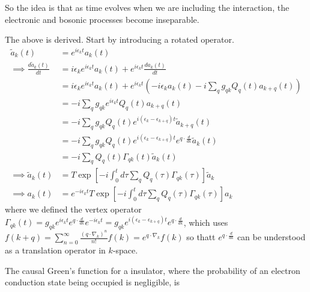 So the idea is that as time evolves when we are including the interaction, the electronic and bosonic processes become inseparable.
\begin{tcolorbox}
The above is derived. Start by introducing a rotated operator.
\begin{align}
    \tilde{a}_k(t)&=e^{i \epsilon_k t} a_k(t) \\
\implies \frac{d \tilde{a}_k(t)}{d t}&=i \epsilon_k e^{i \epsilon_k t} a_k(t)+e^{i \epsilon_k t} \frac{d a_k(t)}{d t} \\
&=i \epsilon_k e^{i \epsilon_k t} a_k(t)+e^{i \epsilon_k t}\left(-i \epsilon_k a_k(t)-i \sum_q g_{q k} Q_q(t) a_{k+q}(t)\right) \\
&=-i \sum_q g_{q k} e^{i \epsilon_k t} Q_q(t) a_{k+q}(t) \\
&=-i \sum_q g_{q k} Q_q(t) e^{i\left(\epsilon_k-\epsilon_{k+q}\right) t} \tilde{a}_{k+q}(t) \\
&=-i \sum_q g_{q k} Q_q(t) e^{i\left(\epsilon_k-\epsilon_{k+q}\right) t} e^{q \cdot \frac{d}{d k}} \tilde{a}_k(t) \\
&= -i \sum_q Q_q(t) \Gamma_{q k}(t) \tilde{a}_k(t) \\
\implies \tilde{a}_k(t)&=T \exp \left[-i \int_0^t d \tau \sum_q Q_q(\tau) \Gamma_{q k}(\tau)\right] \tilde{a}_k \\
\implies a_k(t)&=e^{-i \epsilon_k t} T \exp \left[-i \int_0^t d \tau \sum_q Q_q(\tau) \Gamma_{q k}(\tau)\right] a_k
\end{align}
where we defined the vertex operator $\Gamma_{q k}(t)=g_{q k} e^{i \epsilon_k t} e^{q \cdot \frac{d}{d k}} e^{-i \epsilon_k t} = g_{q k} e^{i\left(\epsilon_k-\epsilon_{k+q}\right) t} e^{q \cdot \frac{d}{d k}} $, which uses
$f(k+q)=\sum_{n=0}^{\infty} \frac{\left(q \cdot \nabla_k\right)^n}{n!} f(k)=e^{q \cdot \nabla_k} f(k)$ so thatt $e^{q \cdot \frac{d}{d k}}$ can be understood as a translation operator in $k$-space.
\end{tcolorbox}
The causal Green's function for a insulator, where the probability of an electron conduction state being occupied is negligible, is
